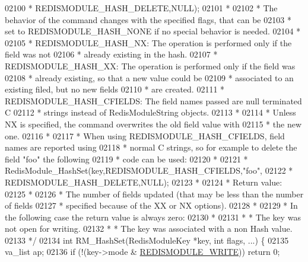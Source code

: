 \begin{DoxyCode}
{{{02100 \textcolor{comment}{ *                          REDISMODULE\_HASH\_DELETE,NULL);}
02101 \textcolor{comment}{ *}
02102 \textcolor{comment}{ * The behavior of the command changes with the specified flags, that can be}
02103 \textcolor{comment}{ * set to REDISMODULE\_HASH\_NONE if no special behavior is needed.}
02104 \textcolor{comment}{ *}
02105 \textcolor{comment}{ *     REDISMODULE\_HASH\_NX: The operation is performed only if the field was not}
02106 \textcolor{comment}{ *                          already existing in the hash.}
02107 \textcolor{comment}{ *     REDISMODULE\_HASH\_XX: The operation is performed only if the field was}
02108 \textcolor{comment}{ *                          already existing, so that a new value could be}
02109 \textcolor{comment}{ *                          associated to an existing filed, but no new fields}
02110 \textcolor{comment}{ *                          are created.}
02111 \textcolor{comment}{ *     REDISMODULE\_HASH\_CFIELDS: The field names passed are null terminated C}
02112 \textcolor{comment}{ *                               strings instead of RedisModuleString objects.}
02113 \textcolor{comment}{ *}
02114 \textcolor{comment}{ * Unless NX is specified, the command overwrites the old field value with}
02115 \textcolor{comment}{ * the new one.}
02116 \textcolor{comment}{ *}
02117 \textcolor{comment}{ * When using REDISMODULE\_HASH\_CFIELDS, field names are reported using}
02118 \textcolor{comment}{ * normal C strings, so for example to delete the field "foo" the following}
02119 \textcolor{comment}{ * code can be used:}
02120 \textcolor{comment}{ *}
02121 \textcolor{comment}{ *      RedisModule\_HashSet(key,REDISMODULE\_HASH\_CFIELDS,"foo",}
02122 \textcolor{comment}{ *                          REDISMODULE\_HASH\_DELETE,NULL);}
02123 \textcolor{comment}{ *}
02124 \textcolor{comment}{ * Return value:}
02125 \textcolor{comment}{ *}
02126 \textcolor{comment}{ * The number of fields updated (that may be less than the number of fields}
02127 \textcolor{comment}{ * specified because of the XX or NX options).}
02128 \textcolor{comment}{ *}
02129 \textcolor{comment}{ * In the following case the return value is always zero:}
02130 \textcolor{comment}{ *}
02131 \textcolor{comment}{ * * The key was not open for writing.}
02132 \textcolor{comment}{ * * The key was associated with a non Hash value.}
02133 \textcolor{comment}{ */}
02134 \textcolor{keywordtype}{int} RM\_HashSet(RedisModuleKey *key, \textcolor{keywordtype}{int} flags, ...) \{
02135     va\_list ap;
02136     \textcolor{keywordflow}{if} (!(key->mode & \hyperlink{redismodule_8h_a73b37117ef94cb4a904361afcc51b6b4}{REDISMODULE\_WRITE})) \textcolor{keywordflow}{return} 0;
}}}
\end{DoxyCode}
